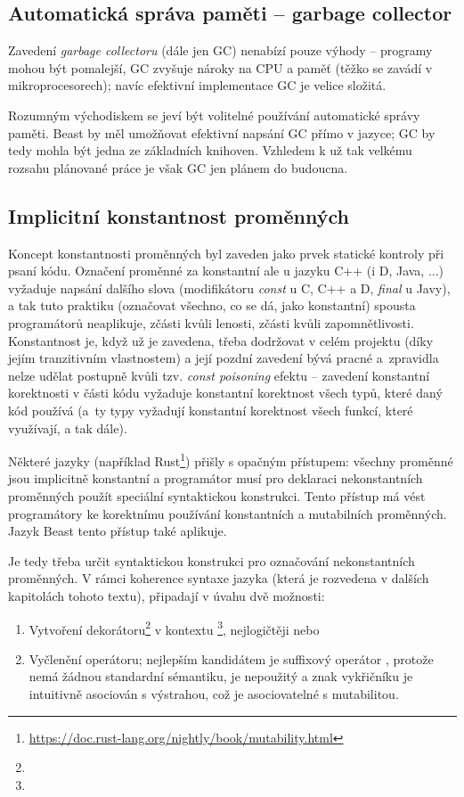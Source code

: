 \subsection{Automatická správa paměti -- garbage collector}
Zavedení \textit{garbage collectoru} (dále jen GC) nenabízí pouze výhody \cite{GarbageCollectionHarmful} -- programy mohou být pomalejší, GC zvyšuje nároky na CPU a paměť (těžko se zavádí v mikroprocesorech); navíc efektivní implementace GC je velice složitá.

Rozumným východiskem se jeví být volitelné používání automatické správy paměti. Beast by měl umožňovat efektivní napsání GC přímo v jazyce; GC by tedy mohla být jedna ze základních knihoven. Vzhledem k už tak velkému rozsahu plánované práce je však GC jen plánem do budoucna.

\subsection{Implicitní konstantnost proměnných} \label{implicitConst}
Koncept konstantnosti proměnných byl zaveden jako prvek statické kontroly při psaní kódu. Označení proměnné za konstantní ale u jazyku C++ (i D, Java, ...) vyžaduje napsání dalšího slova (modifikátoru \textit{const} u C, C++ a D, \textit{final} u Javy), a tak tuto praktiku (označovat všechno, co se dá, jako konstantní) spousta programátorů neaplikuje, zčásti kvůli lenosti, zčásti kvůli zapomnětlivosti. Konstantnost je, když už je zavedena, třeba dodržovat v celém projektu (díky jejím tranzitivním vlastnostem) a její pozdní zavedení bývá pracné a~zpravidla nelze udělat postupně kvůli tzv. \textit{const poisoning} efektu -- zavedení konstantní korektnosti \cite{ConstCorrectness}\cite{ConstCorrectness2} v části kódu vyžaduje konstantní korektnost všech typů, které daný kód používá (a~ty typy vyžadují konstantní korektnost všech funkcí, které využívají, a tak dále).

Některé jazyky (například Rust\footnote{\url{https://doc.rust-lang.org/nightly/book/mutability.html}}) přišly s opačným přístupem: všechny proměnné jsou implicitně konstantní a programátor musí pro deklaraci nekonstantních proměnných použít speciální syntaktickou konstrukci. Tento přístup má vést programátory ke korektnímu používání konstantních a mutabilních proměnných. Jazyk Beast tento přístup také aplikuje.

Je tedy třeba určit syntaktickou konstrukci pro označování nekonstantních proměnných. V rámci koherence syntaxe jazyka (která je rozvedena v dalších kapitolách tohoto textu), připadají  v úvahu dvě možnosti:
\begin{enumerate}
	\item Vytvoření dekorátoru\footnote{} v kontextu \footnote{}, nejlogičtěji  nebo 
	\item Vyčlenění operátoru; nejlepším kandidátem je suffixový operátor , protože nemá žádnou standardní sémantiku, je nepoužitý a znak vykřičníku je intuitivně asociován s výstrahou, což je asociovatelné s mutabilitou.
\end{enumerate}

